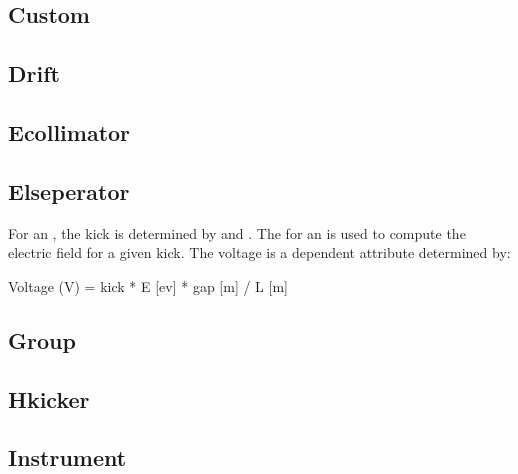 \subsection{Custom}
\label{s:custom}

\subsection{Drift}
\label{s:drift}

\subsection{Ecollimator}
\label{s:ecol}

\subsection{Elseperator}
\label{s:elsep}

For an , the kick is determined by  and
. The  for an  is used to compute
the electric field for a given kick. The voltage is a dependent
attribute determined by:
\begin{example}
  Voltage (V) = kick * E [ev] * gap [m] / L [m] 
\end{example}

\subsection{Group}
\label{s:group}

\subsection{Hkicker}
\label{s:hk}

\subsection{Instrument}
\label{s:inst}

